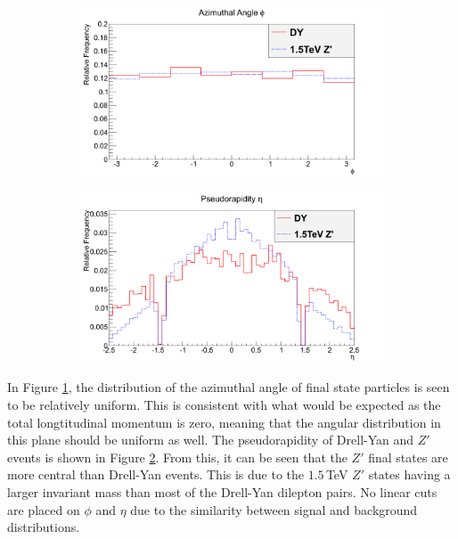 \documentclass{article}
\begin{document}
\begin{figure}[h]
    \centering
    \begin{subfigure}{.49\textwidth}
        \includegraphics[height=0.6\textwidth]{images/variables/Phi.png}
        \caption{}
        \label{fig:phi}
    \end{subfigure}
    \begin{subfigure}{.49\textwidth}
        \includegraphics[height=0.6\textwidth]{images/variables/Eta.png}
        \caption{}
        \label{fig:eta}
    \end{subfigure}
    \caption{\label{fig:etaPhi}}
\end{figure}

In Figure \ref{fig:phi}, the distribution of the azimuthal angle of final state particles is seen to be relatively uniform. This is consistent with what would be expected as the total longtitudinal momentum is zero, meaning that the angular distribution in this plane should be uniform as well. The pseudorapidity of Drell-Yan and $Z'$ events is shown in Figure \ref{fig:eta}. From this, it can be seen that the $Z'$ final states are more central than Drell-Yan events. This is due to the $1.5\,$TeV $Z'$ states having a larger invariant mass than most of the Drell-Yan dilepton pairs. No linear cuts are placed on $\phi$ and $\eta$ due to the similarity between signal and background distributions.
\end{document}

